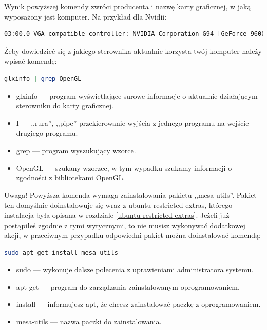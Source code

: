 Wynik powyższej komendy zwróci producenta i nazwę karty graficznej, w jaką wyposażony jest komputer. Na przykład dla Nvidii:
\begin{lstlisting}[language=bash]
03:00.0 VGA compatible controller: NVIDIA Corporation G94 [GeForce 9600 GT] (rev a1)
\end{lstlisting}

Żeby dowiedzieć się z jakiego sterownika aktualnie korzysta twój komputer należy wpisać komendę:

\begin{lstlisting}[language=bash]
glxinfo | grep OpenGL
\end{lstlisting}
\begin{itemize}
\item \textcolor{ubuntu_orange}{glxinfo} --- program wyświetlające surowe informacje o aktualnie działającym sterowniku do karty graficznej.
\item \textcolor{ubuntu_orange}{I} --- ,,rura'', ,,pipe'' przekierowanie wyjścia z jednego programu na wejście drugiego programu. 
\item \textcolor{ubuntu_orange}{grep} --- program wyszukujący wzorce.
\item \textcolor{ubuntu_orange}{OpenGL} --- szukany wzorzec, w tym wypadku szukamy informacji o zgodności z bibliotekami OpenGL.
\end{itemize}

Uwaga! Powyższa komenda wymaga zainstalowania pakietu ,,mesa-utils''. Pakiet ten domyślnie doinstalowuje się wraz z \textcolor{ubuntu_orange}{ubuntu-restricted-extras}, którego instalacja była opisana w rozdziale \ref{ubuntu-restricted-extras}. Jeżeli już postąpiłeś zgodnie z tymi wytycznymi, to nie musisz wykonywać dodatkowej akcji, w przeciwnym przypadku odpowiedni pakiet można doinstalować komendą:
\begin{lstlisting}[language=bash]
sudo apt-get install mesa-utils
\end{lstlisting}
\begin{itemize}
\item \textcolor{ubuntu_orange}{sudo} --- wykonuje dalsze polecenia z uprawieniami administratora systemu.
\item \textcolor{ubuntu_orange}{apt-get} --- program do zarządzania zainstalowanym oprogramowaniem.
\item \textcolor{ubuntu_orange}{install} --- informujesz apt, że chcesz zainstalować paczkę z oprogramowaniem.
\item \textcolor{ubuntu_orange}{mesa-utils} --- nazwa paczki do zainstalowania.
\end{itemize}

